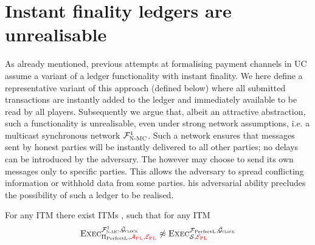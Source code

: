 \section{Instant finality ledgers are unrealisable}
\label{sec:perfect-ledger}
  As already mentioned, previous attempts at formalising payment channels in  
UC~\cite{DBLP:conf/ccs/DziembowskiFH18,Malavolta:2017:CPP:3133956.3134096,sprites,perun}
  assume a variant of a ledger functionality with instant finality. We here
  define a representative variant of this approach \perfectledger{}
  (defined below) where all submitted transactions are
  instantly added to the ledger and immediately available to be read by all
  players. Subsequently we argue that, albeit an attractive abstraction, such a
  functionality is unrealisable, even under strong network assumptions, i.e. a
  multicast synchronous network $\mathcal{F}_{\textsc{N-MC}}^1$. Such a network ensures that
  messages sent by honest parties will be instantly delivered to all other
  parties; no delays can be introduced by the adversary. 
  The  however may choose to send its own messages only to
  specific parties. This allows the adversary to spread conflicting information
  or withhold data from some parties. his adversarial ability
  precludes the possibility of such a  ledger
  to be realised. 

  \begin{theorem}
    \label{theorem:perfectledger}
    For any ITM \perfectprot{} there exist ITMs \perfectenv,
    \perfectadv{} such that for any ITM \simulator
    \begin{equation*}
      \textsc{Exec}^{\FnetworkEd^1, \gFclock}_{\perfectprot,
      \redden{\perfectadv, \perfectenv}} \not\approx
      \textsc{Exec}^{\perfectledger, \gFclock}_{\simulator,
      \redden{\perfectenv}}
    \end{equation*}
  \end{theorem}

